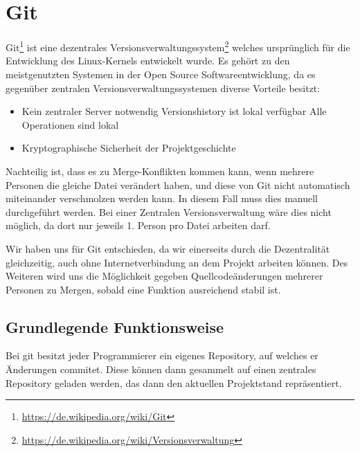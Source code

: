 

\section{Git}
\label{sec:dev-git}
Git\footnote{\url{https://de.wikipedia.org/wiki/Git}} ist eine dezentrales Versionsverwaltungssystem\footnote{\url{https://de.wikipedia.org/wiki/Versionsverwaltung}} welches urspr\"unglich f\"ur die Entwicklung des Linux-Kernels entwickelt wurde. Es geh\"ort zu den meistgenutzten Systemen in der Open Source Softwareentwicklung, da es gegen\"uber zentralen Versionsverwaltungssystemen diverse Vorteile besitzt:

\begin{itemize}
  \item Kein zentraler Server notwendig
  \subitem Versionshistory ist lokal verf\"ugbar
  \subitem Alle Operationen sind lokal
  \item Kryptographische Sicherheit der Projektgeschichte
\end{itemize}

Nachteilig ist, dass es zu Merge-Konflikten kommen kann, wenn mehrere Personen die gleiche Datei ver\"andert haben, und diese von Git nicht automatisch miteinander verschmolzen werden kann. In diesem Fall muss dies manuell durchgef\"uhrt werden. Bei einer Zentralen Versionsverwaltung w\"are dies nicht m\"oglich, da dort nur jeweils 1. Person pro Datei arbeiten darf.

Wir haben uns f\"ur Git entschieden, da wir einerseits durch die Dezentralit\"at gleichzeitig, auch ohne Internetverbindung an dem Projekt arbeiten k\"onnen. Des Weiteren wird uns die M\"oglichkeit gegeben Quellcode\"anderungen mehrerer Personen zu Mergen, sobald eine Funktion ausreichend stabil ist.

\subsection{Grundlegende Funktionsweise}

Bei git besitzt jeder Programmierer ein eigenes Repository, auf welches er \"Anderungen commitet. Diese k\"onnen dann gesammelt auf einen zentrales Repository geladen werden, das dann den aktuellen Projektstand repr\"asentiert.

